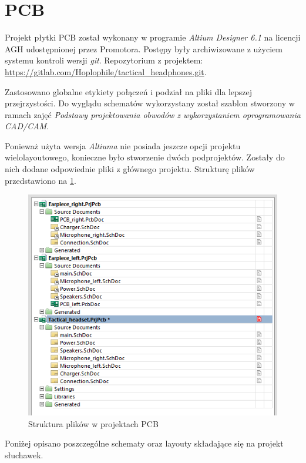 \section{PCB}

Projekt płytki PCB został wykonany w programie \textit{Altium Designer 6.1} na licencji AGH udostępnionej przez Promotora. Postępy były archiwizowane z użyciem systemu kontroli wersji \textit{git}. Repozytorium z projektem: \url{https://gitlab.com/Hoplophile/tactical_headphones.git}.

Zastosowano globalne etykiety połączeń i podział na pliki dla lepszej przejrzystości. Do wyglądu schematów wykorzystany został szablon stworzony w ramach zajęć \textit{Podstawy projektowania obwodów z wykorzystaniem oprogramowania CAD/CAM}. 

Ponieważ użyta wersja \textit{Altiuma} nie posiada jeszcze opcji projektu wielolayoutowego, konieczne było stworzenie dwóch podprojektów. Zostały do nich dodane odpowiednie pliki z głównego projektu. Strukturę plików przedstawiono na \ref{pic:struktura}.

\begin{figure}[H]
	\centering
	\includegraphics[scale=0.6]{zdjecia/PCB/struktura.png}
	\caption{\label{pic:struktura} Struktura plików w projektach PCB}
\end{figure}

Poniżej opisano poszczególne schematy oraz layouty składające się na projekt słuchawek.




